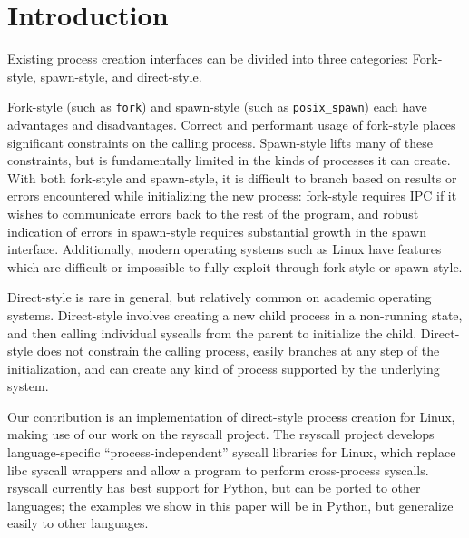\documentclass[sigplan]{acmart}
\begin{document}
\section{Introduction}\label{introduction}
Existing process creation interfaces can be divided into three categories:
Fork-style, spawn-style, and direct-style.

Fork-style (such as \texttt{fork}) and spawn-style (such as \texttt{posix\_spawn}) each have advantages and disadvantages.
Correct and performant usage of fork-style places significant constraints on the calling process.
Spawn-style lifts many of these constraints,
but is fundamentally limited in the kinds of processes it can create.
With both fork-style and spawn-style,
it is difficult to
branch based on results or errors encountered while initializing the new process:
fork-style requires IPC if it wishes to communicate errors back to the rest of the program,
and robust indication of errors in spawn-style requires substantial growth in the spawn interface.
Additionally, modern operating systems such as Linux have features
which are difficult or impossible to fully exploit through fork-style or spawn-style.

Direct-style is rare in general, but relatively common on academic operating systems.
\cite{keykos}\cite{sel4}\cite{exokernel}\cite{fuschia}\cite{singularity}
Direct-style involves creating a new child process in a non-running state,
and then calling individual syscalls from the parent to initialize the child.
Direct-style does not constrain the calling process,
easily branches at any step of the initialization,
and can create any kind of process supported by the underlying system.

Our contribution is an implementation of direct-style process creation for Linux,
making use of our work on the rsyscall project.
The rsyscall project develops language-specific ``process-independent'' syscall libraries for Linux,
which replace libc syscall wrappers and allow a program to perform cross-process syscalls.
rsyscall currently has best support for Python,
but can be ported to other languages;
the examples we show in this paper will be in Python,
but generalize easily to other languages.

\end{document}
